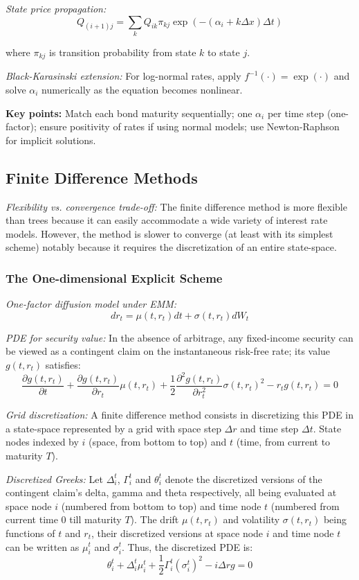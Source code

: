 \documentclass[12pt,a4paper]{article}
\begin{document}
\textit{State price propagation:}
$$Q_{(i+1)j} = \sum_k Q_{ik}\pi_{kj}\exp\left(-(\alpha_i + k\Delta x)\Delta t\right)$$

where $\pi_{kj}$ is transition probability from state $k$ to state $j$.

\textit{Black-Karasinski extension:} For log-normal rates, apply $f^{-1}(\cdot) = \exp(\cdot)$ and solve $\alpha_i$ numerically as the equation becomes nonlinear.

\textbf{Key points:} Match each bond maturity sequentially; one $\alpha_i$ per time step (one-factor); ensure positivity of rates if using normal models; use Newton-Raphson for implicit solutions.

\subsection{Finite Difference Methods}

\textit{Flexibility vs. convergence trade-off:} The finite difference method is more flexible than trees because it can easily accommodate a wide variety of interest rate models. However, the method is slower to converge (at least with its simplest scheme) notably because it requires the discretization of an entire state-space.

\subsubsection{The One-dimensional Explicit Scheme}

\textit{One-factor diffusion model under EMM:}
$$dr_t = \mu(t, r_t)dt + \sigma(t, r_t)dW_t$$

\textit{PDE for security value:} In the absence of arbitrage, any fixed-income security can be viewed as a contingent claim on the instantaneous risk-free rate; its value $g(t, r_t)$ satisfies:
$$\frac{\partial g(t,r_t)}{\partial t} + \frac{\partial g(t,r_t)}{\partial r_t}\mu(t,r_t) + \frac{1}{2}\frac{\partial^2 g(t,r_t)}{\partial r_t^2}\sigma(t,r_t)^2 - r_t g(t,r_t) = 0$$

\textit{Grid discretization:} A finite difference method consists in discretizing this PDE in a state-space represented by a grid with space step $\Delta r$ and time step $\Delta t$. State nodes indexed by $i$ (space, from bottom to top) and $t$ (time, from current to maturity $T$).

\textit{Discretized Greeks:} Let $\Delta_i^t$, $\Gamma_i^t$ and $\theta_i^t$ denote the discretized versions of the contingent claim's delta, gamma and theta respectively, all being evaluated at space node $i$ (numbered from bottom to top) and time node $t$ (numbered from current time 0 till maturity $T$). The drift $\mu(t, r_t)$ and volatility $\sigma(t, r_t)$ being functions of $t$ and $r_t$, their discretized versions at space node $i$ and time node $t$ can be written as $\mu_i^t$ and $\sigma_i^t$. Thus, the discretized PDE is:
$$\theta_i^t + \Delta_i^t\mu_i^t + \frac{1}{2}\Gamma_i^t(\sigma_i^t)^2 - i\Delta r g = 0$$
\end{document}
